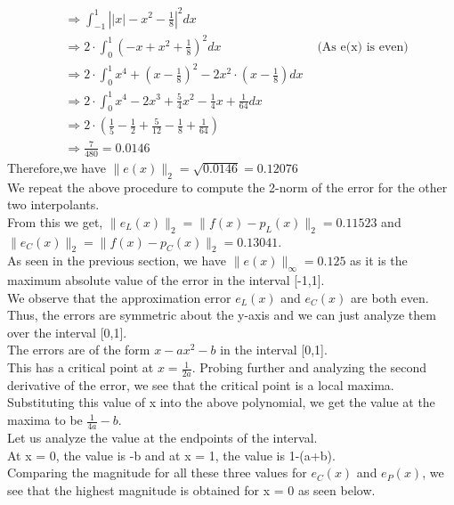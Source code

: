 \documentclass[letterpaper]{exam}
\begin{document}
\begin{questions}
\begin{parts}
\begin{solution}
\begin{align*}
     &\Rightarrow 
     \int_{-1}^{1} \left|\left|x\right| - x^2 - \frac{1}{8}\right|^2 dx\\
     &\Rightarrow
     2\cdot \int_{0}^{1} \left(-x +x^2 + \frac{1}{8}\right)^2 dx &\mbox{ (As e(x) is even)}\\
     &\Rightarrow 
     2\cdot \int_{0}^{1} x^4 + \left(x - \frac{1}{8}\right)^2 - 2x^2\cdot\left(x - \frac{1}{8}\right) dx\\
     &\Rightarrow
     2\cdot \int_{0}^{1} x^4 - 2x^3 + \frac{5}{4}x^2 - \frac{1}{4}x + \frac{1}{64} dx \\
     &\Rightarrow
     2\cdot\left( \frac{1}{5} - \frac{1}{2} + \frac{5}{12} - \frac{1}{8} + \frac{1}{64}\right)\\
     &\Rightarrow 
     \frac{7}{480} = 0.0146
 \end{align*}
 Therefore,we have $\|e(x)\|_2 = \sqrt{0.0146} = 0.12076$ \\
 We repeat the above procedure to compute the 2-norm of the error for the other two interpolants.\\
 From this we get, $\|e_L(x)\|_2 = \|f(x) - p_L(x)\|_2 = 0.11523$ and $\|e_C(x)\|_2 = \|f(x) - p_C(x)\|_2 = 0.13041$.\\
 As seen in the previous section, we have $\|e(x)\|_\infty = 0.125$ as it is the maximum absolute value of the error in the interval [-1,1].\\
 We observe that the approximation error $e_L(x)$ and $e_C(x)$ are both even.\\ Thus, the errors are symmetric about the y-axis and we can just analyze them over the interval [0,1].\\
 The errors are of the form $x - ax^2 - b$ in the interval [0,1].\\
 This has a critical point at $x = \frac{1}{2a}$. Probing further and analyzing the second derivative of the error, we see that the critical point is a local maxima. \\
 Substituting this value of x into the above polynomial, we get the value at the maxima to be $\frac{1}{4a} - b$.\\
 Let us analyze the value at the endpoints of the interval.\\
 At x = 0, the value is -b and at x = 1, the value is 1-(a+b).\\
 Comparing the magnitude for all these three values for $e_C(x)$ and $e_P(x)$, we see that the highest magnitude is obtained for x = 0 as seen below.
 \begin{center}
     \begin{tabular}{|c|c|c|c|}

\end{tabular}
\end{center}
\end{solution}
\end{parts}
\end{questions}
\end{document}

